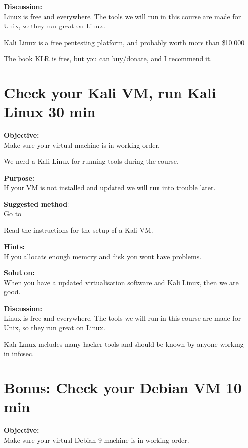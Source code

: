 \documentclass[a4paper,11pt,notitlepage]{report}
\begin{document}
{\bf Discussion:}\\
Linux is free and everywhere. The tools we will run in this course are made for Unix, so they run great on Linux.

Kali Linux is a free pentesting platform, and probably worth more than \$10.000

The book KLR is free, but you can buy/donate, and I recommend it.

\chapter{Check your Kali VM, run Kali Linux 30 min}
\label{ex:basicVM}


{\bf Objective:}\\
Make sure your virtual machine is in working order.

We need a Kali Linux for running tools during the course.

{\bf Purpose:}\\
If your VM is not installed and updated we will run into trouble later.

{\bf Suggested method:}\\
Go to 

Read the instructions for the setup of a Kali VM.

{\bf Hints:}\\
If you allocate enough memory and disk you wont have problems.

{\bf Solution:}\\
When you have a updated virtualisation software and Kali Linux, then we are good.

{\bf Discussion:}\\
Linux is free and everywhere. The tools we will run in this course are made for Unix, so they run great on Linux.

Kali Linux includes many hacker tools and should be known by anyone working in infosec.

\chapter{Bonus: Check your Debian VM 10 min}
\label{ex:basicDebianVM}


{\bf Objective:}\\
Make sure your virtual Debian 9 machine is in working order.
\end{document}
